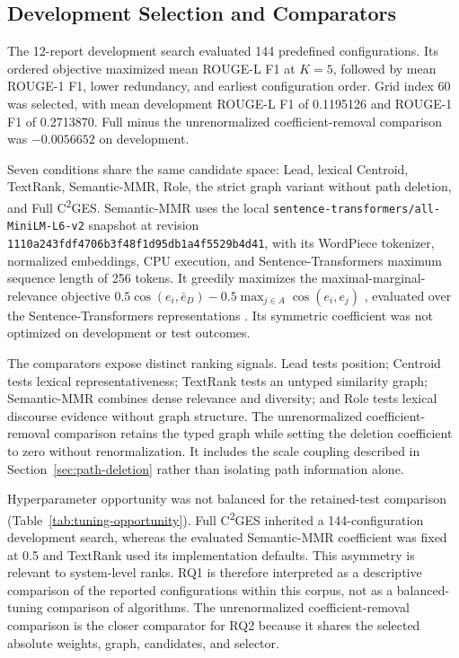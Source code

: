 \documentclass[information,article,submit,moreauthors]{Definitions/mdpi}
\newcommand{\cges}{C\textsuperscript{2}GES}
\begin{document}
\subsection{Development Selection and Comparators}

The 12-report development search evaluated 144 predefined configurations. Its ordered objective maximized mean ROUGE-L F1 at $K=5$, followed by mean ROUGE-1 F1, lower redundancy, and earliest configuration order. Grid index 60 was selected, with mean development ROUGE-L F1 of 0.1195126 and ROUGE-1 F1 of 0.2713870. Full minus the unrenormalized coefficient-removal comparison was $-0.0056652$ on development.

Seven conditions share the same candidate space: Lead, lexical Centroid, TextRank, Semantic-MMR, Role, the strict graph variant without path deletion, and Full \cges{}. Semantic-MMR uses the local \texttt{sentence-transformers/all-MiniLM-L6-v2} snapshot at revision \texttt{1110a243fdf4706b3f48f1d95db1a4f5529b4d41}, with its WordPiece tokenizer, normalized embeddings, CPU execution, and Sentence-Transformers maximum sequence length of 256 tokens. It greedily maximizes the maximal-marginal-relevance objective $0.5\cos(e_i,\bar e_D)-0.5\max_{j\in A}\cos(e_i,e_j)$ \cite{carbonell1998mmr}, evaluated over the Sentence-Transformers representations \cite{reimers2019sentencebert}. Its symmetric coefficient was not optimized on development or test outcomes.

The comparators expose distinct ranking signals. Lead tests position; Centroid tests lexical representativeness; TextRank tests an untyped similarity graph; Semantic-MMR combines dense relevance and diversity; and Role tests lexical discourse evidence without graph structure. The unrenormalized coefficient-removal comparison retains the typed graph while setting the deletion coefficient to zero without renormalization. It includes the scale coupling described in Section~\ref{sec:path-deletion} rather than isolating path information alone.

Hyperparameter opportunity was not balanced for the retained-test comparison (Table~\ref{tab:tuning-opportunity}). Full \cges{} inherited a 144-configuration development search, whereas the evaluated Semantic-MMR coefficient was fixed at 0.5 and TextRank used its implementation defaults. This asymmetry is relevant to system-level ranks. RQ1 is therefore interpreted as a descriptive comparison of the reported configurations within this corpus, not as a balanced-tuning comparison of algorithms. The unrenormalized coefficient-removal comparison is the closer comparator for RQ2 because it shares the selected absolute weights, graph, candidates, and selector.
\end{document}
